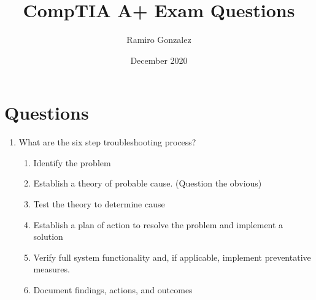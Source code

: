\documentclass{article}
\title{CompTIA A+ Exam Questions}
\author{Ramiro Gonzalez}
\date{December 2020}
\begin{document}
\maketitle
\section{Questions} 
\begin{enumerate}
    \item What are the six step troubleshooting process? 
    \begin{enumerate}
        \item Identify the problem
        \item Establish a theory of probable cause. (Question the obvious) 
        \item Test the theory to determine cause
        \item Establish a plan of action to resolve the problem and implement a solution
        \item Verify full system functionality and, if applicable, implement preventative measures. 
        \item Document findings, actions, and outcomes 
    \end{enumerate}
\end{enumerate}
\end{document}
